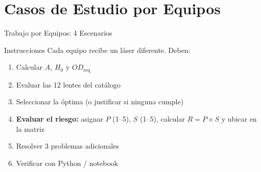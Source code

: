 \documentclass[aspectratio=169,12pt]{beamer}
\begin{document}
\section{Casos de Estudio por Equipos}

\begin{frame}{Trabajo por Equipos: 4 Escenarios}
	\begin{block}{Instrucciones}
		Cada equipo recibe un láser diferente. Deben:
		\begin{enumerate}
			\item Calcular $A$, $H_0$ y $OD_{\mathrm{req}}$
			\item Evaluar las 12 lentes del catálogo
			\item Seleccionar la óptima (o justificar si ninguna cumple)
			\item \textbf{Evaluar el riesgo:} asignar $P$ (1--5), $S$ (1--5),
			      calcular $R = P \times S$ y ubicar en la matriz
			\item Resolver 3 problemas adicionales
			\item Verificar con Python / notebook
		\end{enumerate}
	\end{block}
\end{frame}
\end{document}
